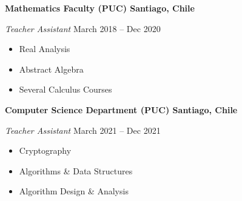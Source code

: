 \documentclass[../main.tex]{subfiles}
\begin{document}
    \textbf{Mathematics Faculty (PUC) \hfill  Santiago, Chile} \par
    \textit{Teacher Assistant} \hfill March 2018 -- Dec 2020 \par
    \begin{itemize}
        \item Real Analysis
        \item Abstract Algebra
        \item Several Calculus Courses
    \end{itemize} \par
    \textbf{Computer Science Department (PUC) \hfill  Santiago, Chile} \par
    \textit{Teacher Assistant} \hfill March 2021 -- Dec 2021 \par
    \begin{itemize}
        \item Cryptography
        \item Algorithms \& Data Structures
        \item Algorithm Design \& Analysis
    \end{itemize} \par
\end{document}
